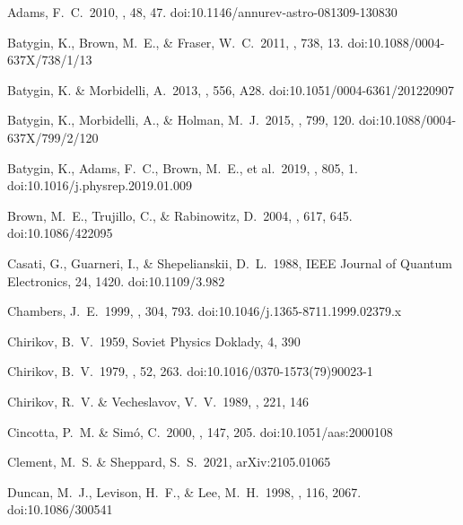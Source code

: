 \documentclass[twocolumn]{aastex62}
\begin{document}
\begin{thebibliography}{00}


 Adams, F.~C.\ 2010, \araa, 48, 47. doi:10.1146/annurev-astro-081309-130830



 Batygin, K., Brown, M.~E., \& Fraser, W.~C.\ 2011, \apj, 738, 13. doi:10.1088/0004-637X/738/1/13

 Batygin, K. \& Morbidelli, A.\ 2013, \aap, 556, A28. doi:10.1051/0004-6361/201220907

 Batygin, K., Morbidelli, A., \& Holman, M.~J.\ 2015, \apj, 799, 120. doi:10.1088/0004-637X/799/2/120

 Batygin, K., Adams, F.~C., Brown, M.~E., et al.\ 2019, \physrep, 805, 1. doi:10.1016/j.physrep.2019.01.009

 Brown, M.~E., Trujillo, C., \& Rabinowitz, D.\ 2004, \apj, 617, 645. doi:10.1086/422095


 Casati, G., Guarneri, I., \& Shepelianskii, D.~L.\ 1988, IEEE Journal of Quantum Electronics, 24, 1420. doi:10.1109/3.982


 Chambers, J.~E.\ 1999, \mnras, 304, 793. doi:10.1046/j.1365-8711.1999.02379.x

 Chirikov, B.~V.\ 1959, Soviet Physics Doklady, 4, 390

 Chirikov, B.~V.\ 1979, \physrep, 52, 263. doi:10.1016/0370-1573(79)90023-1

 Chirikov, R.~V. \& Vecheslavov, V.~V.\ 1989, \aap, 221, 146

 Cincotta, P.~M. \& Sim{\'o}, C.\ 2000, \aaps, 147, 205. doi:10.1051/aas:2000108

 Clement, M.~S. \& Sheppard, S.~S.\ 2021, arXiv:2105.01065



 Duncan, M.~J., Levison, H.~F., \& Lee, M.~H.\ 1998, \aj, 116, 2067. doi:10.1086/300541



\end{thebibliography}
\end{document}
